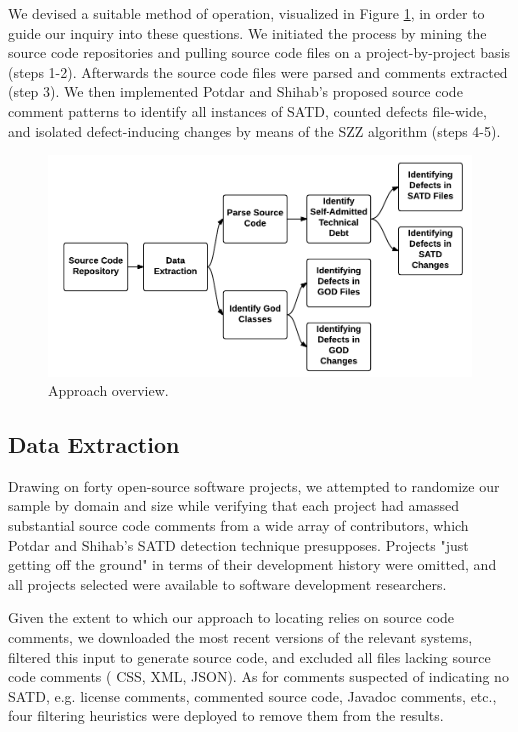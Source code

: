 We devised a suitable method of operation, visualized in Figure \ref{fig:CH4_Process_overview}, in order to guide our inquiry into these questions. We initiated the process by mining the source code repositories and pulling source code files on a project-by-project basis (steps 1-2). Afterwards the source code files were parsed and comments extracted (step 3). We then implemented Potdar and Shihab's proposed source code comment patterns to identify all instances of SATD, counted defects file-wide, and isolated defect-inducing changes by means of the SZZ algorithm (steps 4-5).

\begin{figure}[t]
	\centering
	\includegraphics[width=150mm]{figures/chapter4/approach}
	\caption{Approach overview.}
	\label{fig:CH4_Process_overview}
\end{figure}


\subsection{Data Extraction}

Drawing on forty open-source software projects, we attempted to randomize our sample by domain and size while verifying that each project had amassed substantial source code comments from a wide array of contributors, which Potdar and Shihab's SATD detection technique presupposes. Projects "just getting off the ground" in terms of their development history were omitted, and all projects selected were available to software development researchers.


Given the extent to which our approach to locating \SATD relies on source code comments, we downloaded the most recent versions of the relevant systems, filtered this input to generate source code, and excluded all files lacking source code comments (\eg{} CSS, XML, JSON). As for comments suspected of indicating no SATD, e.g. license comments, commented source code, Javadoc comments, etc., four filtering heuristics were deployed to remove them from the results.


